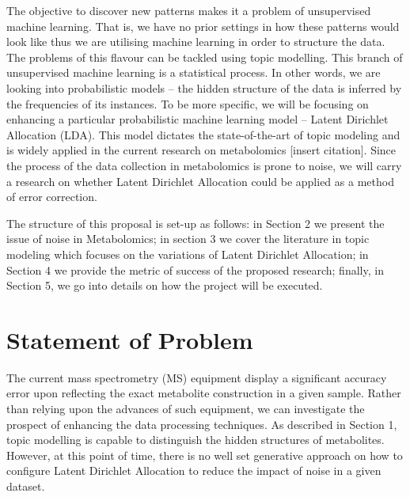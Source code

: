 \documentclass{mprop}
\begin{document}
\par The objective to discover new patterns makes it a problem of unsupervised machine learning. That is, we have no prior settings in how these patterns would look like thus we are utilising machine learning in order to structure the data. The problems of this flavour can be tackled using topic modelling. This branch of unsupervised machine learning is a statistical process. In other words, we are looking into probabilistic models -- the hidden structure of the data is inferred by the frequencies of its instances. To be more specific, we will be focusing on enhancing a particular probabilistic machine learning model -- Latent Dirichlet Allocation (LDA). This model dictates the state-of-the-art of topic modeling and is widely applied in the current research on metabolomics [insert citation]. Since the process of the data collection in metabolomics is prone to noise, we will carry a research on whether Latent Dirichlet Allocation could be applied as a method of error correction. 

\par The structure of this proposal is set-up as follows: in Section 2 we present the issue of noise in Metabolomics; in section 3 we cover the literature in topic modeling which focuses on the variations of Latent Dirichlet Allocation; in Section 4 we provide the metric of success of the proposed research; finally, in Section 5, we go into details on how the project will be executed.

\section{Statement of Problem}

\par The current mass spectrometry (MS) equipment display a significant accuracy error upon reflecting the exact metabolite construction in a given sample. Rather than relying upon the advances of such equipment, we can investigate the prospect of enhancing the data processing techniques. As described in Section 1, topic modelling is capable to distinguish the hidden structures of metabolites. However, at this point of time, there is no well set generative approach on how to configure Latent Dirichlet Allocation to reduce the impact of noise in a given dataset.  
\end{document}

